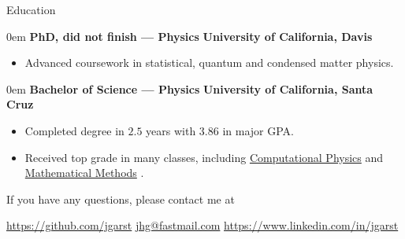 \documentclass[11pt,a4paper]{article}
\newenvironment{headedsection}[2]{
    \begin{addmargin}[0.5em]{0em}
    {\large\bfseries #1} \hfill {\bfseries #2}%
    \begin{itemize}
        [label=-, topsep=0pt, itemsep=0.5ex, parsep=0pt, leftmargin=1em]
}{
    \end{itemize}
    \end{addmargin}
    \medskip
}
\newcommand{\ComputationalPhysics}{
  \href{http://young.physics.ucsc.edu/115/}{Computational Physics}
}
\newcommand{\MathematicalMethods}{
  \href{http://scipp.ucsc.edu/~haber/ph116C/}{Mathematical Methods}
}
\begin{document}
\begin{mysection}{Education}
\begin{headedsection}
      {PhD, did not finish --- Physics}
      {University of California, Davis}
    \item Advanced coursework in statistical, quantum and condensed matter
          physics.

  \end{headedsection}

  \begin{headedsection}{Bachelor of Science --- Physics}
        {University of California, Santa Cruz}
    \item Completed degree in $2.5$ years with $3.86$ in major GPA.
    \item Received top grade in many classes, including \ComputationalPhysics{}
          and \MathematicalMethods{}.

  \end{headedsection}
\end{mysection}

\vfill

\begin{center}
    If you have any questions, please contact me at
\end{center}

\begin{center}
  \href{https://github.com/jgarst}{https://github.com/jgarst}
  \textbullet{}
  \href{mailto:jhg@fastmail.com}{jhg@fastmail.com}
  \textbullet{}
  \href{https://www.linkedin.com/in/jgarst}
       {https://www.linkedin.com/in/jgarst}
\end{center}
\end{document}
